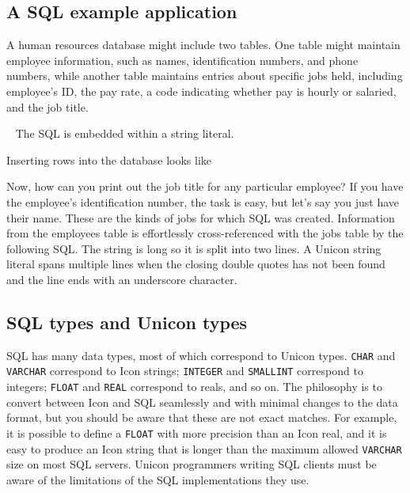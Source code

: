 
\subsection*{A SQL example application}

A human resources database might include two tables. One
table might maintain employee information, such as names,
identification numbers, and phone numbers, while another table
maintains entries about specific jobs held, including
employee's ID, the pay rate, a code indicating whether
pay is hourly or salaried, and the job title.

\medskip{}\ {\sffamily
The SQL is embedded within a string literal.}\medskip


\noindent
Inserting rows into the database looks like


Now, how can you print out the job title for any particular employee? If
you have the employee's identification number, the
task is easy, but let's say you just have their name.
These are the kinds of jobs for which SQL was created. Information from
the employees table is effortlessly cross-referenced with the jobs
table by the following SQL. The string is long so it is split into
two lines. A Unicon string literal spans multiple lines when the
closing double quotes has not been found and the line ends with an
underscore character.


\subsection*{SQL types and Unicon types}

SQL has many data types, most of which correspond to Unicon types.
\texttt{CHAR} and \texttt{VARCHAR} correspond to Icon
strings; \texttt{INTEGER} and \texttt{SMALLINT} correspond to integers;
\texttt{FLOAT} and \texttt{REAL} correspond to reals, and so on. The
philosophy is to convert between Icon and SQL seamlessly and with
minimal changes to the data format, but you should be aware that these
are not exact matches. For example, it is possible to define a
\texttt{FLOAT} with more precision than an Icon real, and it is easy to
produce an Icon string that is longer than the maximum allowed
\texttt{VARCHAR} size on most SQL servers. Unicon programmers writing
SQL clients must be aware of the limitations of the SQL implementations
they use.

